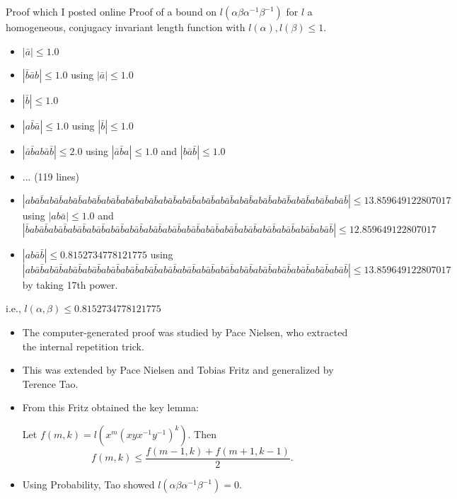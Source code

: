 \documentclass[aspectratio=1610,17pt, ucs]{beamer}
\begin{document}
\begin{frame}{Proof which I posted online}
  \pause
  {\small Proof of a bound on $l(\alpha\beta\alpha^{-1}\beta^{-1})$ for $l$ a homogeneous, conjugacy invariant length function with $l(\alpha), l(\beta) \leq 1$.}\pause
  \tiny
  \begin{itemize}
    \item $|\bar{a}| \leq 1.0$
    \item $|\bar{b}\bar{a}b| \leq 1.0$ using $|\bar{a}| \leq 1.0$
    \item $|\bar{b}| \leq 1.0$
    \item $|a\bar{b}\bar{a}| \leq 1.0$ using $|\bar{b}| \leq 1.0$
    \item $|\bar{a}\bar{b}ab\bar{a}\bar{b}| \leq 2.0$ using $|\bar{a}\bar{b}a| \leq 1.0$ and $|b\bar{a}\bar{b}| \leq 1.0$
    \item ... (119 lines)
    \item $|ab\bar{a}\bar{b}ab\bar{a}\bar{b}ab\bar{a}\bar{b}ab\bar{a}\bar{b}ab\bar{a}\bar{b}ab\bar{a}\bar{b}ab\bar{a}\bar{b}ab\bar{a}\bar{b}ab\bar{a}\bar{b}ab\bar{a}\bar{b}ab\bar{a}\bar{b}ab\bar{a}\bar{b}ab\bar{a}\bar{b}ab\bar{a}\bar{b}ab\bar{a}\bar{b}ab\bar{a}\bar{b}ab\bar{a}\bar{b}| \leq 13.859649122807017$ using $|ab\bar{a}| \leq 1.0$ and $|\bar{b}ab\bar{a}\bar{b}ab\bar{a}\bar{b}ab\bar{a}\bar{b}ab\bar{a}\bar{b}ab\bar{a}\bar{b}ab\bar{a}\bar{b}ab\bar{a}\bar{b}ab\bar{a}\bar{b}ab\bar{a}\bar{b}ab\bar{a}\bar{b}ab\bar{a}\bar{b}ab\bar{a}\bar{b}ab\bar{a}\bar{b}ab\bar{a}\bar{b}ab\bar{a}\bar{b}ab\bar{a}\bar{b}| \leq 12.859649122807017$
    \item $|ab\bar{a}\bar{b}| \leq 0.8152734778121775$ using $|ab\bar{a}\bar{b}ab\bar{a}\bar{b}ab\bar{a}\bar{b}ab\bar{a}\bar{b}ab\bar{a}\bar{b}ab\bar{a}\bar{b}ab\bar{a}\bar{b}ab\bar{a}\bar{b}ab\bar{a}\bar{b}ab\bar{a}\bar{b}ab\bar{a}\bar{b}ab\bar{a}\bar{b}ab\bar{a}\bar{b}ab\bar{a}\bar{b}ab\bar{a}\bar{b}ab\bar{a}\bar{b}ab\bar{a}\bar{b}| \leq 13.859649122807017$ by taking 17th power.
  \end{itemize}
  \pause
  {\small i.e., $l(\alpha, \beta) \leq 0.8152734778121775$}
\end{frame}

\begin{frame}
  \begin{itemize}[<+->]
    \item The computer-generated proof was studied by Pace Nielsen, who extracted the \alert{internal repetition} trick.
    \item This was extended by Pace Nielsen and Tobias Fritz and generalized by Terence Tao.
    \item From this Fritz obtained the key lemma:
    \begin{lemma}
      Let $f(m,k)=l(x^m (xyx^{-1}y^{-1})^k)$. Then $$f(m,k)\leq \frac{f(m-1,k)+f(m+1,k-1)}{2}.$$
    \end{lemma}
    \vspace{-1cm}
    \item Using Probability, Tao showed $l(\alpha\beta\alpha^{-1}\beta^{-1}) = 0$.
  \end{itemize}

\end{frame}
\end{document}
